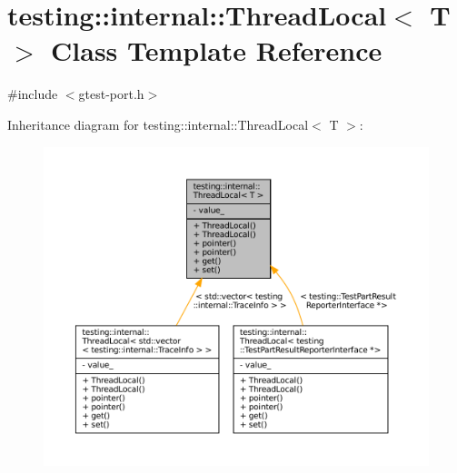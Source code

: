 \hypertarget{classtesting_1_1internal_1_1ThreadLocal}{}\section{testing\+:\+:internal\+:\+:Thread\+Local$<$ T $>$ Class Template Reference}
\label{classtesting_1_1internal_1_1ThreadLocal}


{\ttfamily \#include $<$gtest-\/port.\+h$>$}



Inheritance diagram for testing\+:\+:internal\+:\+:Thread\+Local$<$ T $>$\+:
\nopagebreak
\begin{figure}[H]
\begin{center}
\leavevmode
\includegraphics[width=350pt]{classtesting_1_1internal_1_1ThreadLocal__inherit__graph}
\end{center}
\end{figure}



